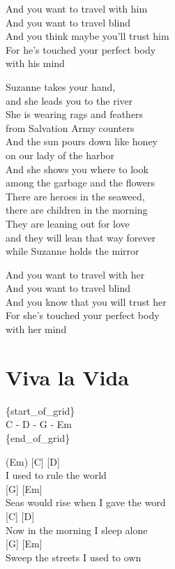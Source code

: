 \documentclass[
  letterpaper,
  DIV=11,
  numbers=noendperiod]{scrreprt}
\begin{document}
And you want to travel with him\\
And you want to travel blind\\
And you think maybe you'll trust him\\
For he's touched your perfect body\\
with his mind

Suzanne takes your hand,\\
and she leads you to the river\\
She is wearing rags and feathers\\
from Salvation Army counters\\
And the sun pours down like honey\\
on our lady of the harbor\\
And she shows you where to look\\
among the garbage and the flowers\\
There are heroes in the seaweed,\\
there are children in the morning\\
They are leaning out for love\\
and they will lean that way forever\\
while Suzanne holds the mirror

And you want to travel with her\\
And you want to travel blind\\
And you know that you will trust her\\
For she's touched your perfect body\\
with her mind

\hypertarget{viva-la-vida}{%
\chapter{Viva la Vida}\label{viva-la-vida}}

\{start\_of\_grid\}\\
C - D - G - Em\\
\{end\_of\_grid\}

(Em) {[}C{]} {[}D{]}\\
I used to rule the world\\
{[}G{]} {[}Em{]}\\
Seas would rise when I gave the word\\
{[}C{]} {[}D{]}\\
Now in the morning I sleep alone\\
{[}G{]} {[}Em{]}\\
Sweep the streets I used to own
\end{document}
